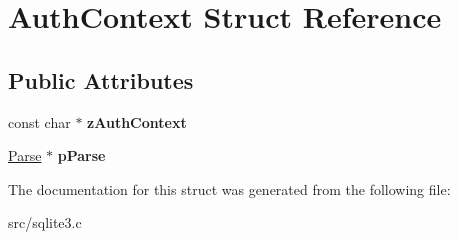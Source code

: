 \hypertarget{struct_auth_context}{\section{Auth\-Context Struct Reference}
\label{struct_auth_context}
}
\subsection*{Public Attributes}
\begin{DoxyCompactItemize}
\item 
\hypertarget{struct_auth_context_a1b095b152b72326476ac3f7edcaee78a}{const char $\ast$ {\bfseries z\-Auth\-Context}}\label{struct_auth_context_a1b095b152b72326476ac3f7edcaee78a}

\item 
\hypertarget{struct_auth_context_a8df2931d8f4facf59073c92315b00bfa}{\hyperlink{struct_parse}{Parse} $\ast$ {\bfseries p\-Parse}}\label{struct_auth_context_a8df2931d8f4facf59073c92315b00bfa}

\end{DoxyCompactItemize}


The documentation for this struct was generated from the following file\-:\begin{DoxyCompactItemize}
\item 
src/sqlite3.\-c\end{DoxyCompactItemize}
